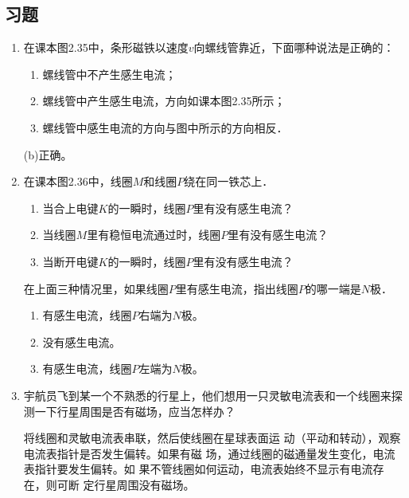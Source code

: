 \subsection{习题}
\begin{enumerate}
    \item 在课本图2.35中，条形磁铁以速度$v$向螺线管靠近，下面哪种说法是正确的：


    \begin{enumerate}
\item 螺线管中不产生感生电流；
\item 螺线管中产生感生电流，方向如课本图2.35所示；
\item 螺线管中感生电流的方向与图中所示的方向相反．
    \end{enumerate}
    

\begin{solution}
(b)正确。
\end{solution}

    \item 在课本图2.36中，线圈$M$和线圈$P$绕在同一铁芯上．
    \begin{enumerate}
        \item 当合上电键$K$的一瞬时，线圈$P$里有没有感生电流？
        \item 当线圈$M$里有稳恒电流通过时，线圈$P$里有没有感生电流？
        \item 当断开电键$K$的一瞬时，线圈$P$里有没有感生电流？
    \end{enumerate}
    在上面三种情况里，如果线圈$P$里有感生电流，指出线圈$P$的哪一端是$N$极．

    \begin{solution}
\begin{enumerate}
    \item 有感生电流，线圈$P$右端为$N$极。
    \item 没有感生电流。
    \item 有感生电流，线圈$P$左端为$N$极。
\end{enumerate}
    \end{solution}
   
    \item 宇航员飞到某一个不熟悉的行星上，他们想用一只灵敏电流表和一个线圈来探测一下行星周围是否有磁场，应当怎样办？
   

\begin{solution}
    将线圈和灵敏电流表串联，然后使线圈在星球表面运
    动（平动和转动），观察电流表指针是否发生偏转。如果有磁
    场，通过线圈的磁通量发生变化，电流表指针要发生偏转。如
    果不管线圈如何运动，电流表始终不显示有电流存在，则可断
    定行星周围没有磁场。
\end{solution}


\end{enumerate}
